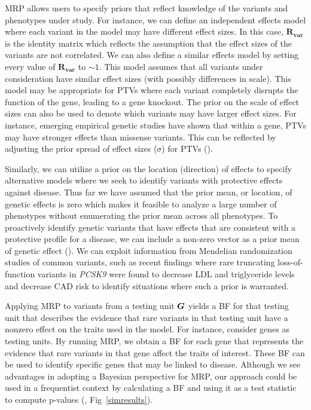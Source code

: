 MRP allows users to specify priors that reflect knowledge of the variants and phenotypes under study. For instance, we can define an independent effects model where each variant in the model may have different effect sizes. In this case, $\mathbf{R_{\textrm{var}}}$ is the identity matrix which reflects the assumption that the effect sizes of the variants are not correlated. We can also define a similar effects model by setting every value of $\mathbf{R_{\textrm{var}}}$ to $\sim 1$. This model assumes that all variants under consideration have similar effect sizes (with possibly differences in scale). This model may be appropriate for PTVs where each variant completely disrupts the function of the gene, leading to a gene knockout. The prior on the scale of effect sizes can also be used to denote which variants may have larger effect sizes. For instance, emerging empirical genetic studies have shown that within a gene, PTVs may have stronger effects than missense variants\cite{do2015exome}. This can be reflected by adjusting the prior spread of effect sizes ($\sigma$) for PTVs ().

Similarly, we can utilize a prior on the location (direction) of effects to specify alternative models where we seek to identify variants with protective effects against disease. Thus far we have assumed that the prior mean, or location, of genetic effects is zero which makes it feasible to analyze a large number of phenotypes without enumerating the prior mean across all phenotypes. To proactively identify genetic variants that have effects that are consistent with a protective profile for a disease, we can include a non-zero vector as a prior mean of genetic effect (). We can exploit information from Mendelian randomization studies of common variants, such as recent findings where rare truncating loss-of-function variants in {\it PCSK9} were found to decrease LDL and triglyceride levels and decrease CAD risk\cite{cohen2005low,pcsk9,do2013common,cohorts2014loss} to identify situations where such a prior is warranted.

Applying MRP to variants from a testing unit ${\boldsymbol G}$ yields a BF for that testing unit that describes the evidence that rare variants in that testing unit have a nonzero effect on the traits used in the model. For instance, consider genes as testing units. By running MRP, we obtain a BF for each gene that represents the evidence that rare variants in that gene affect the traits of interest. These BF can be used to identify specific genes that may be linked to disease. Although we see advantages in adopting a Bayesian perspective for MRP, our approach could be used in a frequentist context by calculating a BF and using it as a test statistic to compute p-values (, Fig~\ref{simresults}).

